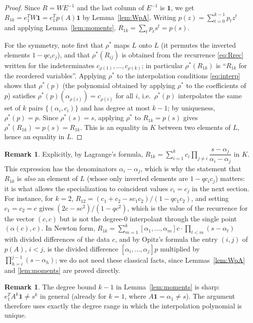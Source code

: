 \documentclass[11pt]{amsart}
\theoremstyle{definition}
\newtheorem{remark}[theorem]{Remark}
\newcommand{\one}{\mathbf{1}}
\begin{document}
\begin{proof}
Since $R=WE^{-1}$ and the last column of $E^{-1}$ is $\one$, we get $R_{1k}=e_1^{T}W\one=e_1^{T}p(A)\one$ by Lemma~\ref{lem:WpA}. Writing $p(z)=\sum_{t=0}^{k-1}p_tz^{t}$ and applying Lemma~\ref{lem:moments}, $R_{1k}=\sum_tp_ts^{t}=p(s)$.

For the symmetry, note first that $\rho^*$ maps $L$ onto $L$ (it permutes the inverted elements $1-qc_ic_j$), and that $\rho^*(R_{ij})$ is obtained from the recurrence \eqref{eq:Rrec} written for the indeterminates $c_{\rho(1)},\dots,c_{\rho(k)}$; in particular $\rho^*(R_{1k})$ is ``$R_{1k}$ for the reordered variables''. Applying $\rho^*$ to the interpolation conditions \eqref{eq:interp} shows that $\rho^*(p)$ (the polynomial obtained by applying $\rho^*$ to the coefficients of $p$) satisfies $\rho^*(p)(\alpha_{\rho(i)})=c_{\rho(i)}$ for all $i$, i.e.\ $\rho^*(p)$ interpolates the same set of $k$ pairs $\{(\alpha_i,c_i)\}$ and has degree at most $k-1$; by uniqueness, $\rho^*(p)=p$. Since $\rho^*(s)=s$, applying $\rho^*$ to $R_{1k}=p(s)$ gives $\rho^*(R_{1k})=p(s)=R_{1k}$. This is an equality in $K$ between two elements of $L$, hence an equality in $L$.
\end{proof}

\begin{remark}\label{rem:lagrange}
Explicitly, by Lagrange's formula, $R_{1k}=\sum_{i=1}^{k}c_i\prod_{j\ne i}\dfrac{s-\alpha_j}{\alpha_i-\alpha_j}$ in $K$. This expression has the denominators $\alpha_i-\alpha_j$, which is why the statement that $R_{1k}$ is \emph{also} an element of $L$ (whose only inverted elements are $1-qc_ic_j$) matters: it is what allows the specialization to coincident values $c_i=c_j$ in the next section. For instance, for $k=2$, $R_{12}=(c_1+c_2-sc_1c_2)/(1-qc_1c_2)$, and setting $c_1=c_2=c$ gives $(2c-sc^2)/(1-qc^2)$, which is the value of the recurrence for the vector $(c,c)$ but is not the degree-$0$ interpolant through the single point $(\alpha(c),c)$. In Newton form, $R_{1k}=\sum_{m=1}^{k}[\alpha_1,\dots,\alpha_m]c\cdot\prod_{t<m}(s-\alpha_t)$ with divided differences of the data $c$, and by Opitz's formula \cite[\S4]{deBoor2005} the entry $(i,j)$ of $p(A)$, $i<j$, is the divided difference $[\alpha_i,\dots,\alpha_j]p$ multiplied by $\prod_{h=i}^{j-1}(s-\alpha_h)$; we do not need these classical facts, since Lemmas~\ref{lem:WpA} and \ref{lem:moments} are proved directly.
\end{remark}

\begin{remark}
The degree bound $k-1$ in Lemma~\ref{lem:moments} is sharp: $e_1^TA^k\one\ne s^k$ in general (already for $k=1$, where $A\one=\alpha_1\ne s$). The argument therefore uses exactly the degree range in which the interpolation polynomial is unique.
\end{remark}
\end{document}
